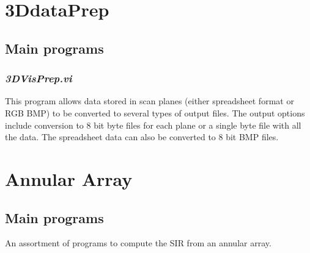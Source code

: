 \documentclass[10pt]{article}
\begin{document}
\section{3DdataPrep}
\subsection{Main programs}
\subsubsection{{\it 3DVisPrep.vi}}

This program allows data stored in scan planes (either spreadsheet
format or RGB BMP) to be converted to several types of output
files. The output options include conversion to 8 bit byte files
for each plane or a single byte file with all the data. The
spreadsheet data can also be converted to 8 bit BMP files.

\section{Annular Array}
\subsection{Main programs}

An assortment of programs to compute the SIR from an annular
array.
\end{document}
